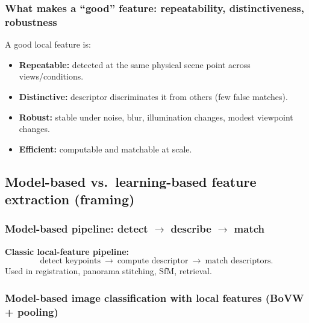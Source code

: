 \documentclass[11pt,a4paper]{article}
\begin{document}
\subsubsection{What makes a ``good'' feature: repeatability, distinctiveness, robustness}
\begin{defbox}
A good local feature is:
\begin{itemize}
  \item \textbf{Repeatable:} detected at the same physical scene point across views/conditions.
  \item \textbf{Distinctive:} descriptor discriminates it from others (few false matches).
  \item \textbf{Robust:} stable under noise, blur, illumination changes, modest viewpoint changes.
  \item \textbf{Efficient:} computable and matchable at scale.
\end{itemize}
\end{defbox}

\subsection{Model-based vs.\ learning-based feature extraction (framing)}
\subsubsection{Model-based pipeline: detect $\rightarrow$ describe $\rightarrow$ match}
\begin{intbox}
\textbf{Classic local-feature pipeline:}
\[
\text{detect keypoints} \ \rightarrow\ \text{compute descriptor}\ \rightarrow\ \text{match descriptors}.
\]
Used in registration, panorama stitching, SfM, retrieval.
\end{intbox}

\subsubsection{Model-based image classification with local features (BoVW + pooling)}
\end{document}
